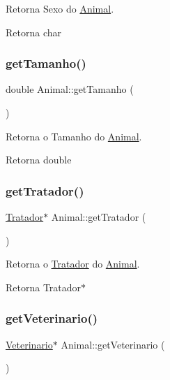 Retorna Sexo do \hyperlink{classAnimal}{Animal}. 

\begin{DoxyReturn}{Retorna}
char 
\end{DoxyReturn}
\mbox{\label{classAnimal_a3936ff4ad07fee3173db2a9dff52c706}} 
\subsubsection{\texorpdfstring{get\+Tamanho()}{getTamanho()}}
{\footnotesize\ttfamily double Animal\+::get\+Tamanho (\begin{DoxyParamCaption}{ }\end{DoxyParamCaption})}



Retorna o Tamanho do \hyperlink{classAnimal}{Animal}. 

\begin{DoxyReturn}{Retorna}
double 
\end{DoxyReturn}
\mbox{\label{classAnimal_ac238dd4fa3762c7bc97f7baebac2d828}} 
\subsubsection{\texorpdfstring{get\+Tratador()}{getTratador()}}
{\footnotesize\ttfamily \hyperlink{classTratador}{Tratador}$\ast$ Animal\+::get\+Tratador (\begin{DoxyParamCaption}{ }\end{DoxyParamCaption})}



Retorna o \hyperlink{classTratador}{Tratador} do \hyperlink{classAnimal}{Animal}. 

\begin{DoxyReturn}{Retorna}
Tratador$\ast$ 
\end{DoxyReturn}
\mbox{\label{classAnimal_a9bdff52128e0ae23bbcac796b68a4d05}} 
\subsubsection{\texorpdfstring{get\+Veterinario()}{getVeterinario()}}
{\footnotesize\ttfamily \hyperlink{classVeterinario}{Veterinario}$\ast$ Animal\+::get\+Veterinario (\begin{DoxyParamCaption}{ }\end{DoxyParamCaption})}



